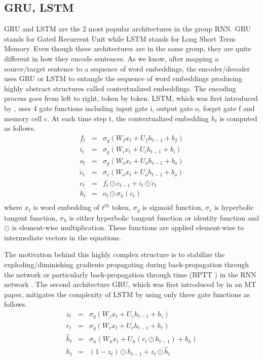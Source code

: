 \subsection{GRU, LSTM}
GRU and LSTM are the 2 most popular architectures in the group RNN. GRU stands for Gated Recurrent Unit while LSTM stands for Long Short Term Memory. Even though these architectures are in the same group, they are quite different in how they encode sentences. As we know, after mapping a source/target sentence to a sequence of word embeddings, the encoder/decoder uses GRU or LSTM to entangle the sequence of word embeddings producing highly abstract structures called contextualized embeddings. The encoding process goes from left to right, token by token. LSTM, which was first introduced by \cite{Hochreiter97long}, uses 4 gate
functions including input gate i, output gate o, forget gate f and memory cell c. At each time step t, the contextualized embedding $h_t$ is computed as follows.
\begin{equation}
\label{eq:lstm}
\begin{array}{rcl}
f_t &=& \sigma_g (W_f x_t + U_f h_{t-1} + b_f)\\
i_t &=& \sigma_g (W_i x_t + U_i h_{t-1} + b_i)\\
o_t &=& \sigma_g (W_o x_t + U_o h_{t-1} + b_o)\\
\tilde{c}_t &=& \sigma_c (W_o x_t + U_o h_{t-1} + b_o)\\
c_t &=& f_t \odot c_{t-1} + i_t \odot \tilde{c}_t\\
h_t &=& o_t \odot \sigma_h(c_t)\\
\end{array}
\end{equation}
where $x_t$ is word embedding of $t^{th}$ token, $\sigma_g$ is sigmoid function, $\sigma_c$ is hyperbolic tangent function, $\sigma_h$ is either hyperbolic tangent function or identity function and $\odot$ is element-wise multiplication. These functions are applied element-wise to intermediate vectors in the equations.

The motivation behind this highly complex structure is to stabilize the exploding/diminishing gradients propagating during back-propagation through the network or particularly back-propagation through time (BPTT ) in the RNN network \citep{Pascanu13onthe}. The second architecture GRU, which was first introduced by \cite{Cho14properties} in an MT paper, mitigates the complexity of LSTM by using only three gate functions as follows.
\begin{equation}
\label{eq:gru}
\begin{array}{rcl}
z_t &=& \sigma_g (W_z x_t + U_z h_{t-1} + b_z)\\
r_t &=& \sigma_g (W_r x_t + U_r h_{t-1} + b_r)\\
\hat{h}_t &=& \sigma_h (W_h x_t + U_h (r_t \odot h_{t-1})+b_h)\\
h_t &=& (1-z_t)\odot h_{t-1} + z_t \odot \hat{h}_t\\
\end{array}
\end{equation}

